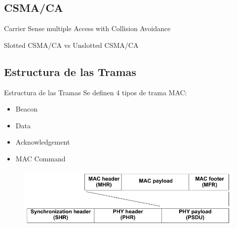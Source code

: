 \documentclass[aspectratio=169, handout]{beamer}
\begin{document}
\subsection[CSMA/CA]{CSMA/CA}

\begin{frame}[T]{Carrier Sense multiple Access with Collision Avoidance}

Slotted CSMA/CA vs Unslotted CSMA/CA

\vspace{10px}

		\begin{figure}[H]
		\end{figure}
\end{frame}


\subsection[Tramas]{Estructura de las Tramas}

\begin{frame}{Estructura de las Tramas}
Se definen 4 tipos de trama MAC:
\vspace{5px}
	\begin{itemize}
		\item Beacon
		\vspace{5px}
		\item Data
		\vspace{5px}
		\item Acknowledgement
		\vspace{5px}
		\item MAC Command
		\vspace{5px}
	\end{itemize}
	\begin{figure}[H]
		\includegraphics[width=.8\textwidth]{./imagenes/frameStructure}
	\end{figure}	 	
\end{frame}
\end{document}
